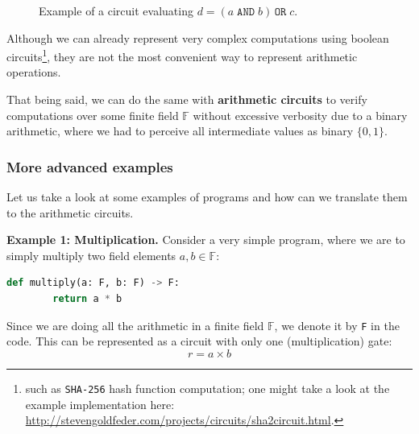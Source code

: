 \documentclass[../lecture-notes-148x210.tex]{subfiles}
\begin{document}
\begin{figure}[h!]
    \centering
    \caption{Example of a circuit evaluating $d = (a \;\texttt{AND}\; b) \,\texttt{OR}\; c$.}
    \label{fig:bool-circuit}
\end{figure}

Although we can already represent very complex computations using boolean
circuits\footnote{such as \texttt{SHA-256} hash function computation; one might
take a look at the example implementation here:
\url{http://stevengoldfeder.com/projects/circuits/sha2circuit.html}.}, they are
not the most convenient way to represent arithmetic operations. 

That being said, we can do the same with \textbf{arithmetic circuits} to verify
computations over some finite field $\mathbb{F}$ without excessive verbosity due
to a binary arithmetic, where we had to perceive all intermediate values as
binary $\{0,1\}$.

\subsubsection{More advanced examples}

Let us take a look at some examples of programs and how can we translate them to
the arithmetic circuits. 

\textbf{Example 1: Multiplication.} Consider a very simple program, where we are
to simply multiply two field elements $a,b \in \mathbb{F}$:

\begin{lstlisting}[language=Python,numbers=none]
    def multiply(a: F, b: F) -> F:
        return a * b
\end{lstlisting}

Since we are doing all the arithmetic in a finite field $\mathbb{F}$, we denote it by \texttt{F} in the code. This can be represented as a circuit with only one (multiplication) gate:
\begin{equation*}
    r = a \times b
\end{equation*}    
\end{document}
